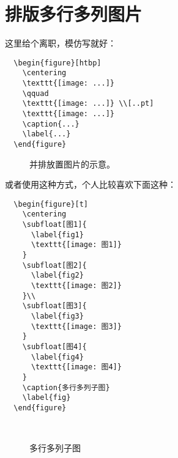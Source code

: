 \section{排版多行多列图片}
这里给个离职，模仿写就好：
\begin{lstlisting}
  \begin{figure}[htbp]
    \centering
    \texttt{[image: ...]}
    \qquad
    \texttt{[image: ...]} \\[..pt]
    \texttt{[image: ...]}
    \caption{...}
    \label{...}
  \end{figure}
\end{lstlisting}
\begin{figure}[htp]
	\centering
	\qquad
	\par\bigskip
	\caption{并排放置图片的示意。}\label{fig:parallel-fig}
\end{figure}
或者使用这种方式，个人比较喜欢下面这种：
\clearpage
\begin{lstlisting}
  \begin{figure}[t]
    \centering
    \subfloat[图1]{
      \label{fig1}
      \texttt{[image: 图1]}
    }
    \subfloat[图2]{
      \label{fig2}
      \texttt{[image: 图2]}
    }\\ 
    \subfloat[图3]{
      \label{fig3}
      \texttt{[image: 图3]}
    } 
    \subfloat[图4]{
      \label{fig4}
      \texttt{[image: 图4]}
    }
    \caption{多行多列子图}
    \label{fig}	
  \end{figure}
\end{lstlisting}
\begin{figure}[H]
	\centering
	\\ 
	\caption{多行多列子图}
	\label{fig}	
\end{figure}